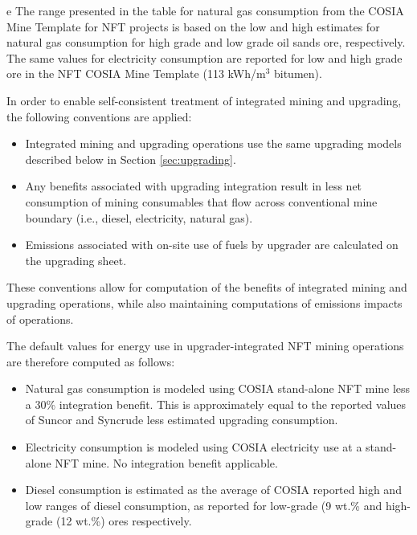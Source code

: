 \documentclass[11pt]{report}
\begin{document}
\begin{landscape}
\begin{table}
\begin{scriptsize}
\begin{threeparttable}
\begin{tablenotes}
\item[e] The range presented in the table for natural gas consumption from the COSIA Mine Template for NFT projects is based on the low and high estimates for natural gas consumption for high grade and low grade oil sands ore, respectively. The same values for electricity consumption are reported for low and high grade ore in the NFT COSIA Mine Template (113 kWh/m$^3$ bitumen).
\end{tablenotes}
\end{threeparttable}
\end{scriptsize}
\end{table}
\end{landscape}


In order to enable self-consistent treatment of integrated mining and upgrading, the following conventions are applied:
\begin{itemize}
\item Integrated mining and upgrading operations use the same upgrading models described below in Section \ref{sec:upgrading}.
\item Any benefits associated with upgrading integration result in less net consumption of mining consumables that flow across conventional mine boundary (i.e., diesel, electricity, natural gas).
\item Emissions associated with on-site use of fuels by upgrader are calculated on the upgrading sheet.
\end{itemize}
These conventions allow for computation of the benefits of integrated mining and upgrading operations, while also maintaining computations of emissions impacts of operations.

The default values for energy use in upgrader-integrated NFT mining operations are therefore computed as follows:
\begin{itemize}
\item Natural gas consumption is modeled using COSIA stand-alone NFT mine less a 30\% integration benefit. This is approximately equal to the reported values of Suncor and Syncrude less estimated upgrading consumption.
\item Electricity consumption is modeled using COSIA electricity use at a stand-alone NFT mine.  No integration benefit applicable.
\item Diesel consumption is estimated as the average of COSIA reported high and low ranges of diesel consumption, as reported for low-grade (9 wt.\% and high-grade (12 wt.\%) ores respectively.
\end{itemize}
\end{document}
